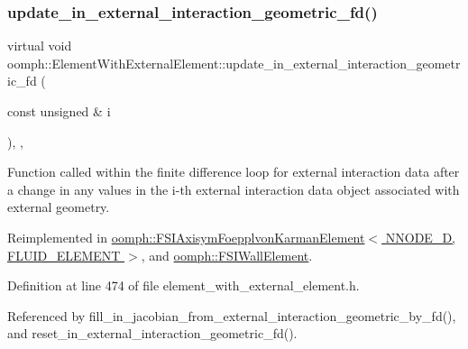\mbox{\label{classoomph_1_1ElementWithExternalElement_ab34f7db5cb5a473c6f5552f34af4a651}} 
\subsubsection{\texorpdfstring{update\+\_\+in\+\_\+external\+\_\+interaction\+\_\+geometric\+\_\+fd()}{update\_in\_external\_interaction\_geometric\_fd()}}
{\footnotesize\ttfamily virtual void oomph\+::\+Element\+With\+External\+Element\+::update\+\_\+in\+\_\+external\+\_\+interaction\+\_\+geometric\+\_\+fd (\begin{DoxyParamCaption}\item[{const unsigned \&}]{i }\end{DoxyParamCaption})\hspace{0.3cm}{\ttfamily [inline]}, {\ttfamily [protected]}, {\ttfamily [virtual]}}



Function called within the finite difference loop for external interaction data after a change in any values in the i-\/th external interaction data object associated with external geometry. 



Reimplemented in \hyperlink{classoomph_1_1FSIAxisymFoepplvonKarmanElement_ac3284ec67a975078466ec03d55f65416}{oomph\+::\+F\+S\+I\+Axisym\+Foepplvon\+Karman\+Element$<$ N\+N\+O\+D\+E\+\_\+D, F\+L\+U\+I\+D\+\_\+\+E\+L\+E\+M\+E\+N\+T $>$}, and \hyperlink{classoomph_1_1FSIWallElement_a495cc7de04e097186f497a7416655736}{oomph\+::\+F\+S\+I\+Wall\+Element}.



Definition at line 474 of file element\+\_\+with\+\_\+external\+\_\+element.\+h.



Referenced by fill\+\_\+in\+\_\+jacobian\+\_\+from\+\_\+external\+\_\+interaction\+\_\+geometric\+\_\+by\+\_\+fd(), and reset\+\_\+in\+\_\+external\+\_\+interaction\+\_\+geometric\+\_\+fd().



